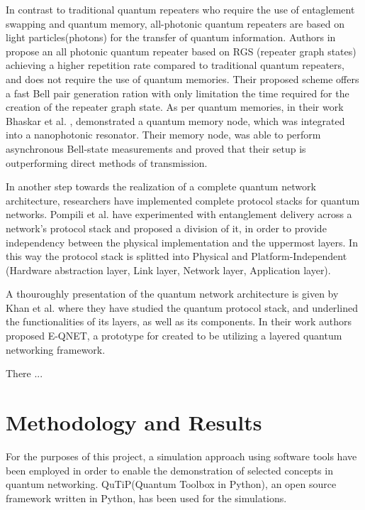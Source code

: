 \documentclass[12pt,a4paper] {report}
\begin{document}
		In contrast to traditional quantum repeaters who require the use of entaglement swapping and quantum memory, all-photonic quantum repeaters
		are based on light particles(photons) for the transfer of quantum information.
		Authors in \cite{repeater1} propose an all photonic quantum repeater 
		based on RGS (repeater graph states) achieving a higher repetition rate compared to traditional quantum repeaters, and does not require 
		the use of quantum memories. Their proposed scheme offers a fast Bell pair generation ration with only
		limitation the time required for the creation of the repeater graph state. 
		As per quantum memories, in their work Bhaskar et al. \cite{memories}, demonstrated a quantum memory node, which
		was integrated into a nanophotonic resonator. Their memory node, was able to perform asynchronous Bell-state measurements
		and proved that their setup is outperforming direct methods of transmission.
		

		In another step towards the realization of a complete quantum network architecture,
		researchers have implemented complete protocol stacks for quantum networks.
		Pompili et al. \cite{pompilli} have experimented with entanglement delivery across 
		a network's protocol stack and proposed a division of it, in order to provide 
		independency between the physical implementation and the uppermost layers. 
		In this way the protocol stack is splitted into Physical and Platform-Independent
		(Hardware abstraction layer, Link layer, Network layer, Application layer).
		
		A thouroughly presentation of the quantum network architecture is given by Khan et al. \cite{e-qnet}
		where they have studied the quantum protocol stack, and underlined the functionalities of its layers, as well 
		as its components. In their work authors proposed E-QNET, a prototype for  created to be utilizing a layered quantum networking
		framework.
		
		There ...  \cite{powergrid}







	\chapter{Methodology and Results}
		
		For the purposes of this project, a
		simulation approach using software tools
		have been employed in order to enable the
		demonstration of selected concepts in quantum networking.
		QuTiP(Quantum Toolbox in Python)\cite{qutip}, an open source framework
		written in Python, has been used for the simulations.
\end{document}
